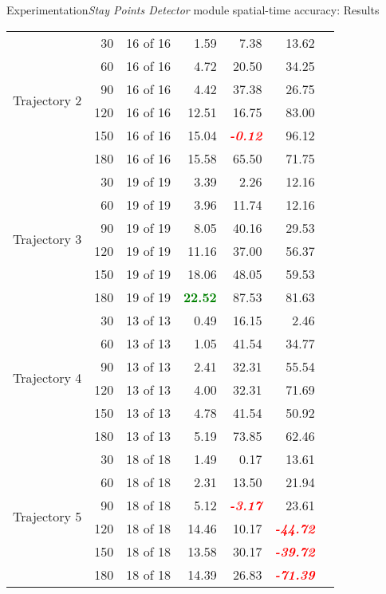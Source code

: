 \begin{frame}[noframenumbering]{Experimentation}{\emph{Stay Points Detector} module spatial-time accuracy: Results}
\begin{table}
{\begin{tabular}{@{}lrrrrrr@{}}
\multirow{6}{*}{Trajectory 2} 
 & 30 & 16 of 16 & 1.59 & 7.38 & 13.62 \\
 & 60 & 16 of 16 & 4.72 & 20.50 & 34.25 \\
 & 90 & 16 of 16 & 4.42 & 37.38 & 26.75 \\
 & 120 & 16 of 16 & 12.51 & 16.75 & 83.00 \\
 & 150 & 16 of 16 & 15.04 & \textcolor{red}{\textbf{\emph{-0.12}}} & 96.12 \\
 & 180 & 16 of 16 & 15.58 & 65.50 & 71.75 \\
 \cmidrule(l){1-6}

\multirow{6}{*}{Trajectory 3} 
 & 30 & 19 of 19 & 3.39 &  2.26 & 12.16 \\
 & 60 & 19 of 19 & 3.96 &  11.74 & 12.16 \\
 & 90 & 19 of 19 & 8.05 &  40.16 & 29.53 \\
 & 120 & 19 of 19 & 11.16  & 37.00 & 56.37 \\
 & 150 & 19 of 19 & 18.06  & 48.05 & 59.53 \\
 & 180 & 19 of 19 & \textcolor{green}{\textbf{22.52}} & 87.53 & 81.63 \\
 \cmidrule(l){1-6}

\multirow{6}{*}{Trajectory 4} 
 & 30 & 13 of 13 & 0.49 &  16.15 & 2.46 \\
 & 60 & 13 of 13 & 1.05 &  41.54 & 34.77 \\
 & 90 & 13 of 13 & 2.41 &  32.31 & 55.54 \\
 & 120 & 13 of 13 & 4.00 & 32.31 & 71.69 \\
 & 150 & 13 of 13 & 4.78 & 41.54 & 50.92 \\
 & 180 & 13 of 13 & 5.19 & 73.85 & 62.46 \\
 \cmidrule(l){1-6}

\multirow{6}{*}{Trajectory 5} 
 & 30 & 18 of 18 & 1.49 & 0.17 & 13.61 \\
 & 60 & 18 of 18 & 2.31 & 13.50 & 21.94 \\
 & 90 & 18 of 18 & 5.12 & \textcolor{red}{\textbf{\emph{-3.17}}} & 23.61 \\
 & 120 & 18 of 18 & 14.46 & 10.17 & \textcolor{red}{\textbf{\emph{-44.72}}} \\
 & 150 & 18 of 18 & 13.58 & 30.17 & \textcolor{red}{\textbf{\emph{-39.72}}} \\
 & 180 & 18 of 18 & 14.39 & 26.83 & \textcolor{red}{\textbf{\emph{-71.39}}} \\
 \cmidrule(l){1-6}


\end{tabular}}
\end{table}
\end{frame}
